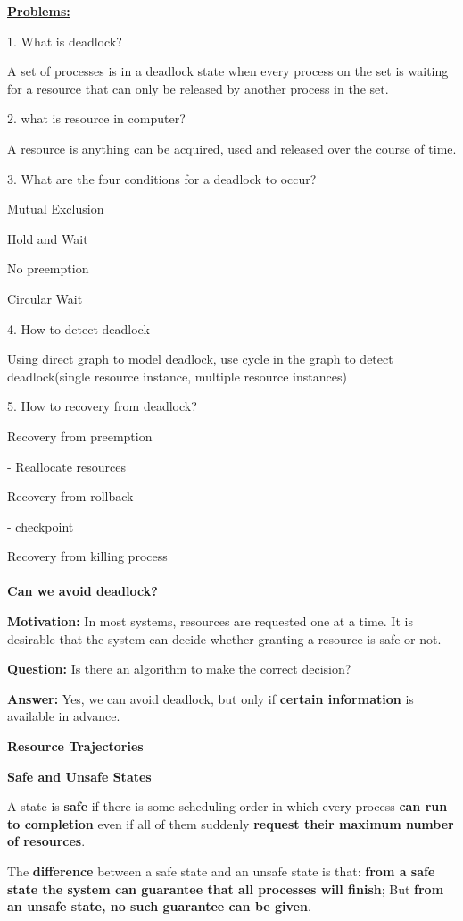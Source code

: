 \documentclass[]{report}
\begin{document}
\textbf{\underline{Problems: }}

1. What is deadlock?

A set of processes is in a deadlock state when every process on the set is waiting for a resource that can only be released by another process in the set.

2. what is resource in computer?

A resource is anything can be acquired, used and released over the course of time.

3. What are the four conditions for a deadlock to occur?

Mutual Exclusion

Hold and Wait

No preemption

Circular Wait

4. How to detect deadlock

Using direct graph to model deadlock, use cycle in the graph to detect deadlock(single resource instance, multiple resource instances)

5. How to recovery from deadlock?

Recovery from preemption

- Reallocate resources

Recovery from rollback

- checkpoint

Recovery from killing process\\\\
\textbf{Can we avoid deadlock?}

\textbf{Motivation:} In most systems, resources are
requested one at a time. It is desirable that the
system can decide whether granting a resource is
safe or not.

\textbf{Question:} Is there an algorithm to make the
correct decision?

\textbf{Answer:} Yes, we can avoid deadlock, but only if
\textbf{certain information} is available in advance.

\textbf{Resource Trajectories}

\textbf{Safe and Unsafe States}

A state is \textbf{safe} if there is some scheduling order in which every process \textbf{can
run to completion} even if all of them suddenly \textbf{request their maximum
number of resources}.

The \textbf{difference} between a safe state
and an unsafe state is that:
\textbf{from a safe state the system can
guarantee that all processes will
finish}; But \textbf{from an unsafe state, no
such guarantee can be given}.
\end{document}
